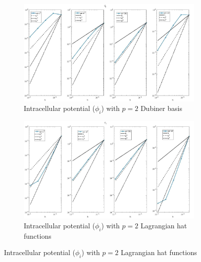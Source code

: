 \documentclass[a4paper,11pt]{article}
\begin{document}
\begin{figure}[H]
\caption{Comparison of the intracellular potential ($\phi_i$)}
\label{phii_2}
\begin{subfigure}{\textwidth}
\begin{center}
\includegraphics[width = \textwidth]{./errors/D2_Phii_1.jpg}
\caption{Intracellular potential ($\phi_i$) with $p=2$ Dubiner basis}
\end{center}
\end{subfigure}
\begin{subfigure}{\textwidth}
\begin{center}
\includegraphics[width =\textwidth]{./errors/P2_Phii_1.jpg}
\caption{Intracellular potential ($\phi_i$) with $p=2$ Lagrangian hat functions}
\end{center}
\end{subfigure}
\end{figure}
\newpage
\end{document}
